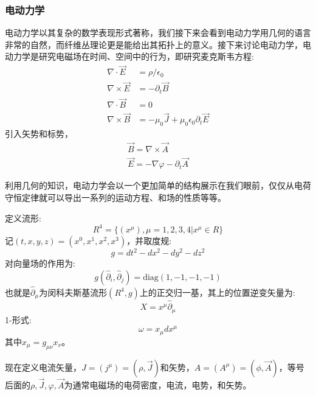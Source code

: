 \documentclass[supercite]{HustGraduPaper}
\begin{document}
    \subsubsection{电动力学}
    电动力学以其复杂的数学表现形式著称，我们接下来会看到电动力学用几何的语言非常的自然，而纤维丛理论更是能给出其拓扑上的意义。接下来讨论电动力学，电动力学是研究电磁场在时间、空间中的行为，即研究麦克斯韦方程:
    \begin{equation}
    \begin{aligned}
    \nabla \cdot \vec{E} &= \rho/\epsilon_0\\
    \nabla \times \vec{E} &= -\partial_t \vec{B}\\
    \nabla \cdot \vec{B} &= 0\\
    \nabla \times \vec{B} &= -\mu_0 \vec{J} + \mu_0 \epsilon_0 \partial_t \vec{E}
    \end{aligned}
    \end{equation}
    引入矢势和标势，
    \begin{equation}
    \begin{aligned}
    \vec{B} = \nabla \times \vec{A}\\
    \vec{E} = - \nabla \varphi - \partial_t \vec{A}
    \end{aligned}
    \end{equation}
        
    利用几何的知识，电动力学会以一个更加简单的结构展示在我们眼前，仅仅从电荷守恒定律就可以导出一系列的运动方程、和场的性质等等。
    
    定义流形:
   	\begin{equation}
   	R^4 = \{(x^\mu), \mu = 1,2,3,4| x^\mu \in R\}
   	\end{equation}
记$(t,x,y,z) = (x^0,x^1,x^2,x^3)$，并取度规:
\begin{equation}
g = dt^2 - dx^2 - dy^2 - dz^2
\end{equation}    
对向量场的作用为:
\begin{equation}
g(\hat{\partial}_i, \hat{\partial}_j) = \text{diag}(1,-1,-1,-1)
\end{equation}
也就是$\hat{\partial}_\mu$为闵科夫斯基流形$(R^4,g)$上的正交归一基，其上的位置逆变矢量为:
\begin{equation}
X = x^\mu \hat{\partial}_\mu
\end{equation}
1-形式:
\begin{equation}
\omega = x_\mu dx^\mu
\end{equation}
其中$x_\mu = g_{\mu \nu} x_\nu$。

现在定义电流矢量，$J = (j^\mu) = (\rho,\vec{J})$和矢势，$A = (A^\mu) = (\phi,\vec{A})$，等号后面的$\rho,\vec{J},\varphi,\vec{A}$为通常电磁场的电荷密度，电流，电势，和矢势。
\end{document}
